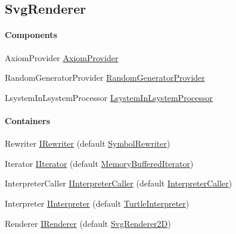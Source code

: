 



	


\subsection{SvgRenderer}
\label{SvgRenderer}
	\paragraph{Components}
	\begin{description*}
		\item[AxiomProvider] \hyperref[Malsys.Processing.Components.Common.AxiomProvider]{AxiomProvider}
		\item[RandomGeneratorProvider] \hyperref[Malsys.Processing.Components.Common.RandomGeneratorProvider]{RandomGeneratorProvider}
		\item[LsystemInLsystemProcessor] \hyperref[Malsys.Processing.Components.Common.LsystemInLsystemProcessor]{LsystemInLsystemProcessor}
	\end{description*}
	\paragraph{Containers}
	\begin{description*}
		\item[Rewriter] \hyperref[Malsys.Processing.Components.IRewriter]{IRewriter} (default \hyperref[Malsys.Processing.Components.Rewriters.SymbolRewriter]{SymbolRewriter})
		\item[Iterator] \hyperref[Malsys.Processing.Components.IIterator]{IIterator} (default \hyperref[Malsys.Processing.Components.RewriterIterators.MemoryBufferedIterator]{MemoryBufferedIterator})
		\item[InterpreterCaller] \hyperref[Malsys.Processing.Components.IInterpreterCaller]{IInterpreterCaller} (default \hyperref[Malsys.Processing.Components.Interpreters.InterpreterCaller]{InterpreterCaller})
		\item[Interpreter] \hyperref[Malsys.Processing.Components.IInterpreter]{IInterpreter} (default \hyperref[Malsys.Processing.Components.Interpreters.TurtleInterpreter]{TurtleInterpreter})
		\item[Renderer] \hyperref[Malsys.Processing.Components.IRenderer]{IRenderer} (default \hyperref[Malsys.Processing.Components.Renderers.SvgRenderer2D]{SvgRenderer2D})
	\end{description*}

